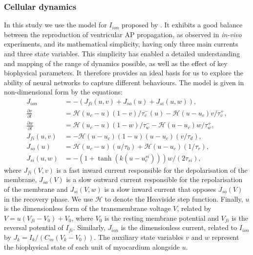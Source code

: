 \documentclass[utf8]{frontiersSCNS} %
\begin{document}
\subsubsection{Cellular dynamics}
\label{ch:methods:mathematical_model:cellular_dynamics}
In this study we use the model for $I_{ion}$ proposed by \cite{Fenton1998}. It exhibits a good balance between the reproduction of ventricular AP propagation, as observed in \textit{in-vivo} experiments, and its mathematical simplicity, having only three main currents and three state variables. This simplicity has enabled a detailed understanding and mapping of the range of dynamics possible, as well as the effect of key biophysical parameters. It therefore provides an ideal basis for us to explore the ability of neural networks to capture different behaviours. The model is given in non-dimensional form by the equations:
\begin{align*}
    J_{ion} &=  - ({J_{fi}(u , v) + J_{so}(u) + J_{si}(u, w)}),\\
    \frac{\partial v}{\partial t} &= \mathcal{H}(u_c - u)(1-v)/\tau_v^-(u) - \mathcal{H}(u-u_c)v/\tau_v^+,\\
    \frac{\partial w}{\partial t} &= \mathcal{H}(u_c - u)(1-w)/\tau_w^- - \mathcal{H}(u-u_c)w/\tau_w^+,\\
    J_{fi}(u, v) &= - \mathcal{H}(u-u_c)(1-u)(u-u_c)(v/\tau_d),\\
    J_{so}(u)    &= \mathcal{H}(u_c-u)(u/\tau_0) + \mathcal{H}(u-u_c)(1/\tau_r),\\
    J_{si}(u, w) &= -(1+ \tanh(k(u-u_c^{si})))w/(2\tau_{si}),
\end{align*}
where $J_{fi}(V, v)$ is a fast inward current responsible for the depolarisation of the membrane, $J_{so}(V)$ is a slow outward current responsible for the repolarisation of the membrane and $J_{si}(V, w)$ is a slow inward current that opposes $J_{so}(V)$ in the recovery phase. We use $\mathcal{H}$ to denote the Heaviside step function. Finally, $u$ is the dimensionless form of the transmembrane voltage $V$, related by $V = u(V_{fi} -V_0) + V_0$, where $V_0$ is the resting membrane potential and $V_{fi}$ is the reversal potential of $I_{fi}$. Similarly, $J_{ion}$ is the dimensionless current, related to $I_{ion}$ by $J_k = I_k / (C_m(V_{k} - V_0))$. The auxiliary state variables $v$ and $w$ represent the biophysical state of each unit of myocardium alongside $u$.
\end{document}
